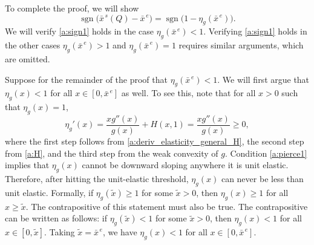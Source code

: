 \documentclass[12pt]{article}
\DeclareMathOperator*{\sgn}{sgn}
\newcommand{\general}{g}
\newcommand{\xshortbar}{\bar{x}^{\,s}}
\newcommand{\xunitbar}{\bar{x}^{\,e}}
\newcommand{\elasticity}[1]{\eta_{#1}}
\newcommand{\xtilde}{\tilde{x}}
\begin{document}
To complete the proof, we will show
\begin{equation}
\label{a:sign1}
 \sgn \bigl( \xshortbar\!(Q) - \xunitbar \bigr) = \sgn \bigl( 1 -
 \elasticity{\general}\!(\xunitbar) \bigr).
\end{equation}
We will verify \eqref{a:sign1} holds in the case
$\elasticity{\general}\!(\xunitbar) < 1$. Verifying \eqref{a:sign1}
holds in the other cases $\elasticity{\general}\!(\xunitbar) > 1$ and
$\elasticity{\general}\!(\xunitbar) = 1$ requires similar arguments,
which are omitted.

Suppose for the remainder of the proof that
$\elasticity{\general}\!(\xunitbar) < 1$. We will first argue that
$\elasticity{\general}\!(x) < 1$ for all $x \in [0, \xunitbar]$ as
well. To see this, note that for all $x > 0$ such that
$\elasticity{\general}\!(x) = 1$,
\begin{equation}
\label{a:pierce1}
\elasticity{\general}'\!(x) = \frac{x \general''(x)}{\general(x)} +
H(x, 1) = \frac{x \general''(x)}{\general(x)} \geq 0,
\end{equation}
where the first step follows from
\eqref{a:deriv_elasticity_general_H}, the second step from
\eqref{a:H}, and the third step from the weak convexity of
$\general$. Condition \eqref{a:pierce1} implies that
$\elasticity{\general}(x)$ cannot be downward sloping anywhere it is
unit elastic. Therefore, after hitting the unit-elastic threshold,
$\elasticity{\general}(x)$ can never be less than unit
elastic. Formally, if $\elasticity{\general}\!(\xtilde) \geq 1$ for
some $\xtilde > 0$, then $\elasticity{\general}\!(x) \geq 1$ for all
$x \geq \xtilde$. The contrapositive of this statement must also be
true. The contrapositive can be written as follows: if
$\elasticity{\general}\!(\xtilde) < 1$ for some $\xtilde > 0$, then
$\elasticity{\general}\!(x) < 1$ for all $x \in [0, \xtilde]$. Taking
$\xtilde = \xunitbar$, we have $\elasticity{\general}\!(x) < 1$ for
all $x \in [0, \xunitbar]$.
\end{document}
